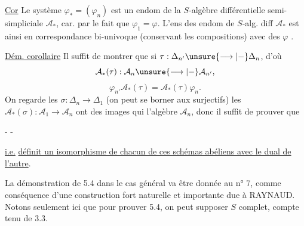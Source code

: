 
\uline{Cor}  Le système $\varphi_*=(\varphi_n)$ est un endom de la $S$-algèbre différentielle semi-simpliciale $\mathcal A_*$, car. \uline{} par le fait que $\varphi_1=\varphi$. L'ens des endom de $S$-alg. diff $\mathcal A_*$ est ainsi en correspondance bi-univoque (conservant les compositions) avec  des $\varphi$ .

\uline{Dém.  corollaire} Il suffit de montrer que si $\tau:\Delta_{n'}\unsure{\longrightarrow|-}\Delta_n$, d'où
\[
\mathcal A_*(\tau):\mathcal A_n\unsure{\longrightarrow|-}\mathcal A_{n'},
\]
\[
\varphi_{n'}\mathcal A_*(\tau)=\mathcal A_*(\tau)\varphi_n.
\]
On regarde les $\sigma:\Delta_n\longrightarrow\Delta_1$  (on peut se  borner aux surjectifs) les $\mathcal A_*(\sigma):\mathcal A_1\to\mathcal A_n$ ont des images qui  l'algèbre $\mathcal A_n$, donc il suffit de prouver que

\begin{center}-  -\end{center}

\uline{i.e.} \uline{définit un isomorphisme de chacun de ces schémas abéliens avec le dual de l'autre}.

La démonstration de 5.4 dans le cas général va être donnée au n° 7, comme conséquence d'une construction fort naturelle et importante due à RAYNAUD. Notons seulement ici que pour prouver 5.4, on peut supposer $S$ complet, compte tenu de 3.3.

